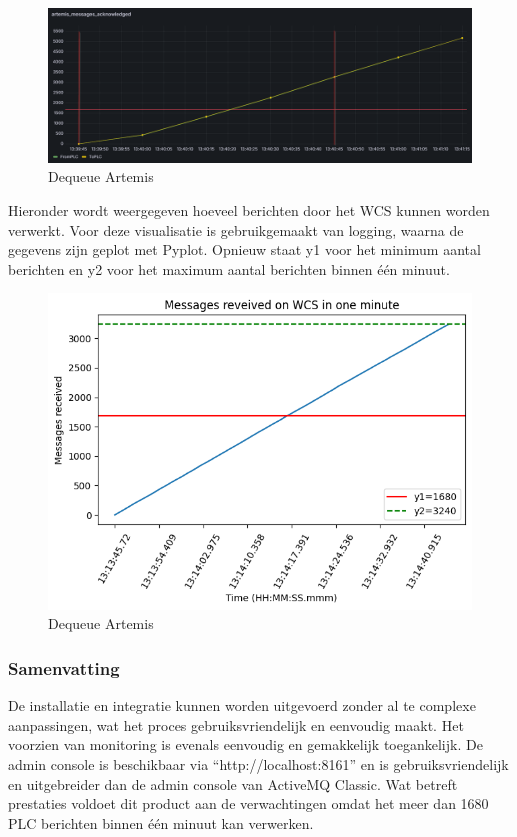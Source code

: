 \begin{figure}[h!]
  \centering
  \includegraphics[width=.95\textwidth]{img/artemis-dequeue-count.png}
  \caption{\label{fig:artemis_dequeue_count}Dequeue Artemis}
\end{figure}
\newpage
Hieronder wordt weergegeven hoeveel berichten door het WCS kunnen worden verwerkt.
Voor deze visualisatie is gebruikgemaakt van logging, waarna de gegevens zijn geplot met Pyplot.
Opnieuw staat y1 voor het minimum aantal berichten en y2 voor het maximum aantal berichten binnen één minuut.
\begin{figure}[h!]
  \centering
  \includegraphics[width=.95\textwidth]{img/artemis_received_wcs.png}
  \caption{\label{fig:artemis_dequeue_count}Dequeue Artemis}
\end{figure}

\subsubsection{Samenvatting}
De installatie en integratie kunnen worden uitgevoerd zonder al te complexe aanpassingen, 
wat het proces gebruiksvriendelijk en eenvoudig maakt.
Het voorzien van monitoring is evenals eenvoudig en gemakkelijk toegankelijk. 
De admin console is beschikbaar via ``http://localhost:8161'' en is gebruiksvriendelijk en uitgebreider dan de admin console van ActiveMQ Classic.
Wat betreft prestaties voldoet dit product aan de verwachtingen omdat het meer dan 1680 PLC berichten binnen één minuut kan verwerken.